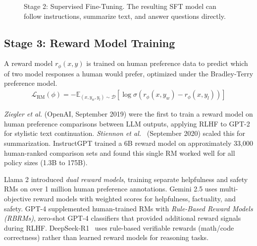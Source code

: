 \documentclass[12pt]{article}
\begin{document}
\begin{figure}[ht]
\caption{Stage 2: Supervised Fine-Tuning. The resulting SFT model can follow instructions, summarize text, and answer questions directly.}
\label{fig:stage2_sft}
\end{figure}

\subsection{Stage 3: Reward Model Training}

A reward model $r_\phi(x, y)$ is trained on human preference data to predict which of two model responses a human would prefer, optimized under the Bradley-Terry preference model.
\begin{align}
\mathcal{L}_{\text{RM}}(\phi) = -\mathbb{E}_{(x, y_w, y_l) \sim \mathcal{D}} \left[ \log \sigma\!\left( r_\phi(x, y_w) - r_\phi(x, y_l) \right) \right]
\end{align}

\textit{Ziegler et al.} (OpenAI, September 2019) were the first to train a reward model on human preference comparisons between LLM outputs, applying RLHF to GPT-2 for stylistic text continuation. \textit{Stiennon et al.}~\cite{Stiennon2020Summarize} (September 2020) scaled this for summarization. InstructGPT trained a 6B reward model on approximately 33,000 human-ranked comparison sets and found this single RM worked well for all policy sizes (1.3B to 175B).

Llama 2 introduced \textit{dual reward models}, training separate helpfulness and safety RMs on over 1 million human preference annotations. Gemini 2.5 uses multi-objective reward models with weighted scores for helpfulness, factuality, and safety. GPT-4 supplemented human-trained RMs with \textit{Rule-Based Reward Models (RBRMs)}, zero-shot GPT-4 classifiers that provided additional reward signals during RLHF. DeepSeek-R1~\cite{Guo2025DeepSeekR1} uses rule-based verifiable rewards (math/code correctness) rather than learned reward models for reasoning tasks.
\end{document}
